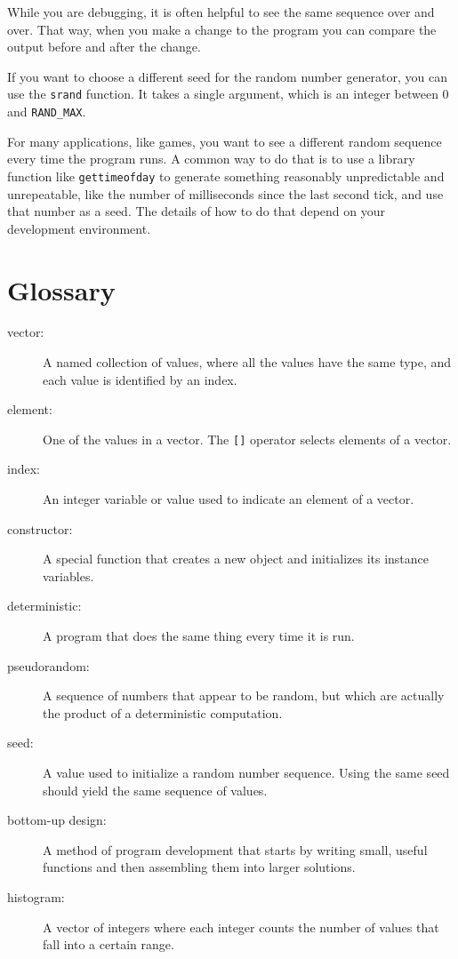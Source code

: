 While you are debugging, it is often helpful to
see the same sequence over and over.  That way, when you make
a change to the program you can compare the output before and
after the change.

If you want to choose a different seed for the random number
generator, you can use the {\tt srand} function.  It takes
a single argument, which is an integer between 0 and {\tt RAND\_MAX}.

For many applications, like games, you want to see a different
random sequence every time the program runs.  A common way to
do that is to use a library function like {\tt gettimeofday}
to generate something reasonably unpredictable
and unrepeatable, like the number of milliseconds since the
last second tick, and use that number as a seed.  The details
of how to do that depend on your development environment.

\section{Glossary}

\begin{description}

\item[vector:]  A named collection of values, where all the
values have the same type, and each value is identified by
an index.

\item[element:]  One of the values in a vector.  The {\tt []}
operator selects elements of a vector.

\item[index:]  An integer variable or value used to indicate
an element of a vector.

\item[constructor:]  A special function that creates a new
object and initializes its instance variables.

\item[deterministic:]  A program that does the same thing every
time it is run.

\item[pseudorandom:]  A sequence of numbers that appear to be
random, but which are actually the product of a deterministic
computation.

\item[seed:]  A value used to initialize a random number sequence.
Using the same seed should yield the same sequence of values.

\item[bottom-up design:]  A method of program development that
starts by writing small, useful functions and then assembling
them into larger solutions.

\item[histogram:]  A vector of integers where each integer
counts the number of values that fall into a certain range.


\end{description}
